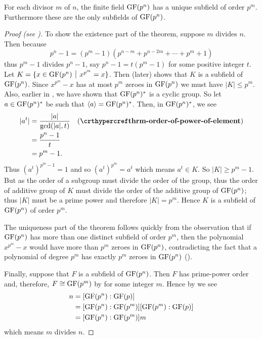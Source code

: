 \begin{theorem}\label{thrm-subfields-of-finite-field}
    For each divisor $m$ of $n$, the finite field $\mathrm{GF}(p^n)$ has a unique subfield of order $p^m$. Furthermore these are the only subfields of $\mathrm{GF}(p^n)$.
\end{theorem}
\begin{proof}[Proof (see {\cite[Theorem 22.3]{gallian_2016}})]
    To show the existence part of the theorem, suppose $m$ divides $n$. Then because
    \[
        p^n - 1 = (p^m-1)(p^{n-m} + p^{n-2m} + \cdots + p^m + 1)
    \]
    thus $p^m - 1$ divides $p^n - 1$, say $p^n - 1 = t(p^m - 1)$ for some positive integer $t$. Let $K = \{x \in \GF{p^n} \vert x^{p^m} = x\}$. Then  (later) shows that $K$ is a subfield of $\mathrm{GF}(p^n)$. Since $x^{p^m} - x$ has at most $p^m$ zeroes in $\mathrm{GF}(p^n)$ we must have $|K| \leq p^m$. Also, earlier in , we have shown that $\mathrm{GF}(p^n)^\ast$ is a cyclic group. So let $a \in \mathrm{GF}(p^n)^\ast$ be such that $\left\langle a\right\rangle = \mathrm{GF}(p^n)^\ast$. Then, in $\mathrm{GF}(p^n)^\ast$, we see
    \begin{align*}
        |a^t| &= \frac{|a|}{\gcd(|a|, t)} & (\myref{thrm-order-of-power-of-element})\\
        &= \frac{p^n - 1}{t}\\
        &= p^m - 1.
    \end{align*}
    Thus $(a^t)^{p^m-1} = 1$ and so $(a^t)^{p^m} = a^t$ which means $a^t \in K$. So $|K| \geq p^m - 1$. But as the order of a subgroup must divide the order of the group, thus the order of additive group of $K$ must divide the order of the additive group of $\mathrm{GF}(p^n)$; thus $|K|$ must be a prime power and therefore $|K| = p^m$. Hence $K$ is a subfield of $\mathrm{GF}(p^n)$ of order $p^m$.

    The uniqueness part of the theorem follows quickly from the observation that if $\mathrm{GF}(p^n)$ has more than one distinct subfield of order $p^m$, then the polynomial $x^{p^m} - x$ would have more than $p^m$ zeroes in $\mathrm{GF}(p^n)$, contradicting the fact that a polynomial of degree $p^m$ has exactly $p^m$ zeroes in $\mathrm{GF}(p^n)$ ().

    Finally, suppose that $F$ is a subfield of $\mathrm{GF}(p^n)$. Then $F$ has prime-power order and, therefore, $F \cong \mathrm{GF}(p^m)$ by  for some integer $m$. Hence by  we see
    \begin{align*}
        n &= [\mathrm{GF}(p^n):\mathrm{GF}(p)]\\
        &= [\mathrm{GF}(p^n):\mathrm{GF}(p^m)][\mathrm{GF}(p^m):\mathrm{GF}(p)]\\
        &= [\mathrm{GF}(p^n):\mathrm{GF}(p^m)]m
    \end{align*}
    which means $m$ divides $n$.
\end{proof}

